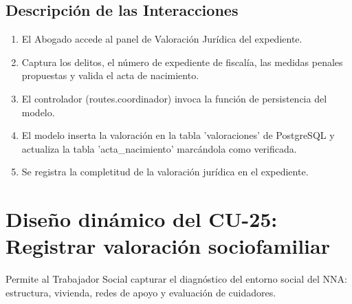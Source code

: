 \subsection{Descripción de las Interacciones}
\begin{enumerate}
    \item El Abogado accede al panel de Valoración Jurídica del expediente.
    \item Captura los delitos, el número de expediente de fiscalía, las medidas penales propuestas y valida el acta de nacimiento.
    \item El controlador (routes.coordinador) invoca la función de persistencia del modelo.
    \item El modelo inserta la valoración en la tabla 'valoraciones' de PostgreSQL y actualiza la tabla 'acta\_nacimiento' marcándola como verificada.
    \item Se registra la completitud de la valoración jurídica en el expediente.
\end{enumerate}

\cleardoublepage
\section{Diseño dinámico del CU-25: Registrar valoración sociofamiliar}
\label{sec:disenoDinamicoCU25}

Permite al Trabajador Social capturar el diagnóstico del entorno social del NNA: estructura, vivienda, redes de apoyo y evaluación de cuidadores.

